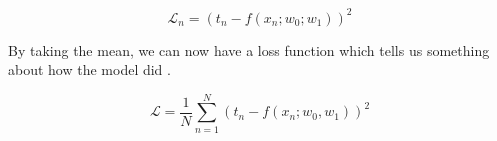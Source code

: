 			$$\mathcal{L}_{n}=\left(t_{n}-f\left(x_{n} ; w_{0} ; w_{1}\right)\right)^{2}$$


			\par{By taking the mean, we can now have a loss function which tells us something about how the model did .}

			$$\mathcal{L}=\frac{1}{N} \sum_{n=1}^{N}\left(t_{n}-f\left(x_{n} ; w_{0}, w_{1}\right)\right)^{2}$$

			
















